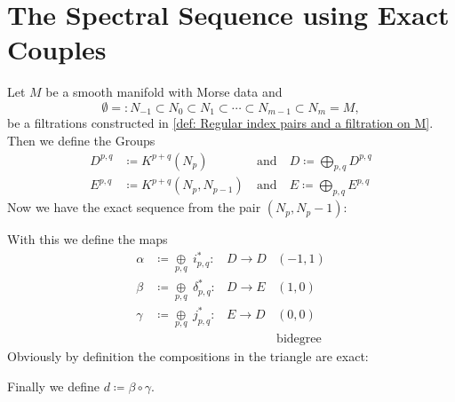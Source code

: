 \section{The Spectral Sequence using Exact Couples}
\begin{definition}\label{def: Exact Couple giving A Morse Sps} Let $M$ be a smooth manifold with Morse data and
	\begin{equation*}
		\emptyset=:N_{-1}\subset N_0\subset N_1\subset \cdots \subset N_{m-1}\subset N_m=M,
	\end{equation*} be a filtrations constructed in \ref{def: Regular index pairs and a filtration on M}. Then we define the Groups
	\begin{equation*}
		\begin{array}{llll}
			D^{p,q} & \coloneq K^{p+q}(N_p)&
			~\text{and}~&D \coloneq \bigoplus_{p,q}D^{p,q}\\
			E^{p,q} & \coloneq K^{p+q}(N_p,N_{p-1})
			&~\text{and}~ &E\coloneq \bigoplus_{p,q}E^{p,q}
		\end{array}
	\end{equation*}
	Now we have the exact sequence from the pair $(N_p,N_p-1)$:
	\begin{center}
	\end{center}
	With this we define the maps
	\begin{equation*}
		\begin{array}{lll|l}
			\alpha&\coloneq \mathop{\oplus}\limits_{p,q}~i_{p,q}^*:&D\to D&(-1,1)\\
			\beta&\coloneq  \mathop{\oplus}\limits_{p,q}~\delta_{p,q}^*:&D\to E&(1,0)\\
			\gamma&\coloneq \mathop{\oplus}\limits_{p,q}~j_{p,q}^*:&E\to D&(0,0)\\
			&&&\text{bidegree}
		\end{array}
	\end{equation*}
	Obviously by definition the compositions in the triangle are exact:
	\begin{center}
	\end{center}
	Finally we define $d\coloneq \beta\circ \gamma$.
\end{definition}
